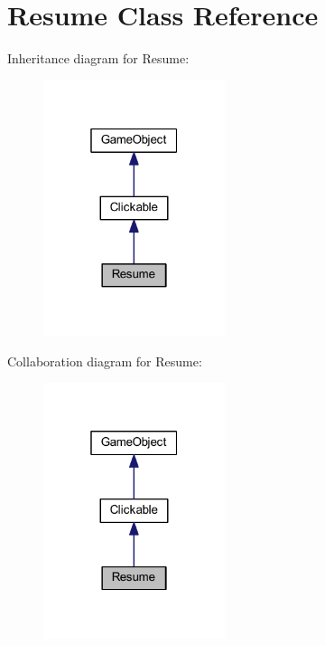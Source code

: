 \hypertarget{class_resume}{\section{Resume Class Reference}
\label{class_resume}
}


Inheritance diagram for Resume\+:\nopagebreak
\begin{figure}[H]
\begin{center}
\leavevmode
\includegraphics[width=151pt]{class_resume__inherit__graph}
\end{center}
\end{figure}


Collaboration diagram for Resume\+:\nopagebreak
\begin{figure}[H]
\begin{center}
\leavevmode
\includegraphics[width=151pt]{class_resume__coll__graph}
\end{center}
\end{figure}
